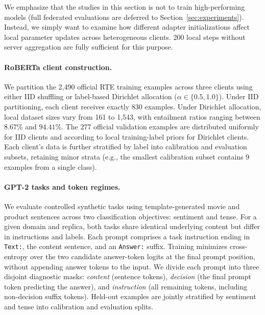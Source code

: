 \documentclass[11pt,letterpaper]{article}
\begin{document}
We emphasize that the studies in this section is not to train high-performing models (full federated evaluations are deferred to Section~\ref{sec:experiments}). Instead, we simply want to examine how different adapter initializations affect local parameter updates across heterogeneous clients. 200 local steps without server aggregation are fully sufficient for this purpose. 


\paragraph{RoBERTa client construction.}
We partition the 2,490 official RTE training examples across three clients using either IID shuffling or label-based Dirichlet allocation ($\alpha \in \{0.5, 1.0\}$). Under IID partitioning, each client receives exactly 830 examples. Under Dirichlet allocation, local dataset sizes vary from 161 to 1,543, with entailment ratios ranging between $8.67\%$ and $94.41\%$. The 277 official validation examples are distributed uniformly for IID clients and according to local training-label priors for Dirichlet clients. Each client's data is further stratified by label into calibration and evaluation subsets, retaining minor strata (e.g., the smallest calibration subset contains 9 examples from a single class). 


\paragraph{GPT-2 tasks and token regimes.}
We evaluate controlled synthetic tasks using template-generated movie and product sentences across two classification objectives: sentiment and tense. For a given domain and replica, both tasks share identical underlying content but differ in instructions and labels. Each prompt comprises a task instruction ending in \texttt{Text:}, the content sentence, and an \texttt{Answer:} suffix. Training minimizes cross-entropy over the two candidate answer-token logits at the final prompt position, without appending answer tokens to the input. We divide each prompt into three disjoint diagnostic masks: \emph{content} (sentence tokens), \emph{decision} (the final prompt token predicting the answer), and \emph{instruction} (all remaining tokens, including non-decision suffix tokens). Held-out examples are jointly stratified by sentiment and tense into calibration and evaluation splits. 
\end{document}
